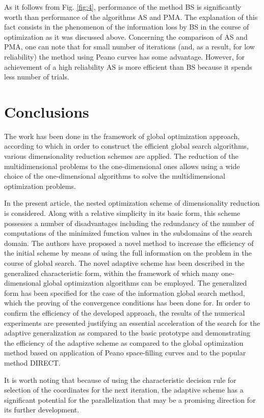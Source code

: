 \documentclass[smallextended]{svjour3}
\let\origref\ref
\renewcommand{\ref}[1]{(\origref{#1})}
\begin{document}
As it follows from Fig. \origref{fig:4}, performance of the method BS is significantly worth than performance of the algorithms AS and PMA. The explanation of this fact consists in the phenomenon of the information loss by BS in the course of optimization as it was discussed above. Concerning the comparison of AS and PMA, one can note that for small number of iterations (and, as a result, for low reliability) the method using Peano  curves  has some  advantage. However, for achievement of a high reliability AS is more efficient than BS because it spends less number of trials.
\section{Conclusions}
\label{sec:7}
The work has been done in the framework of global optimization approach, according to which in order to construct the efficient global search algorithms, various dimensionality reduction schemes are applied. The reduction of the multidimensional problems to the one-dimensional ones allows using a wide choice of the one-dimensional algorithms to solve the multidimensional optimization problems.

In the present article, the nested optimization scheme of dimensionality reduction is considered. Along with a relative simplicity in its basic form, this scheme possesses a number of disadvantages including the redundancy of the number of computations of the minimized function values in the subdomains of the search domain. The authors have proposed a novel method to increase the efficiency of the initial scheme by means of using the full information on the problem in the course of global search. The novel adaptive scheme has been described in the generalized characteristic form, within the framework of which many one-dimensional global optimization algorithms can be employed. The generalized form has been specified for the case of the information global search method, which the proving of the convergence conditions has been done for. In order to confirm the efficiency of the developed approach, the results of the numerical experiments are presented justifying an essential acceleration of the search for the adaptive generalization as compared to the basic prototype and demonstrating the efficiency of the adaptive scheme as compared to the global optimization method based on application of Peano space-filling curves and to the popular method DIRECT.

It is worth noting that because of using the characteristic decision rule for selection of the coordinates for the next iteration, the adaptive scheme has a significant potential for the parallelization that may be a promising direction for its further development.
\end{document}
